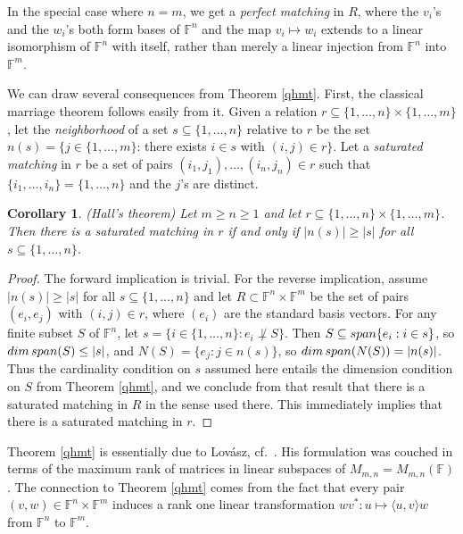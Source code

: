 \documentclass[10pt,a4paper]{amsart}
\newtheorem{cor}[thm]{Corollary}
\begin{document}
In the special case where $n = m$, we get a {\it perfect matching} in $R$, where the $v_i$'s and the $w_i$'s both form bases of $\mathbb{F}^n$ and the map $v_i \mapsto w_i$ extends to a linear isomorphism of $\mathbb{F}^n$ with itself, rather than merely a linear injection from $\mathbb{F}^n$ into $\mathbb{F}^m$.

We can draw several consequences from Theorem \ref{qhmt}. First, the classical marriage theorem follows easily from it. Given a relation $r \subseteq \{1, \ldots, n\} \times \{1, \ldots, m\}$, let the {\it neighborhood} of a set $s \subseteq \{1, \ldots, n\}$ relative to $r$ be the set $n(s) = \{j \in \{1, \ldots, m\}$: there exists $i \in s$ with $(i,j) \in r\}$. Let a {\it saturated matching} in $r$ be a set of pairs $(i_1, j_1), \ldots, (i_n, j_n) \in r$ such that $\{i_1, \ldots, i_n\} = \{1, \ldots, n\}$ and the $j$'s are distinct.

\begin{cor} \label{qhmtc} (Hall's theorem)
Let $m \geq n \geq 1$ and let $r \subseteq \{1, \ldots, n\}\times \{1, \ldots, m\}$. Then there is a saturated matching in $r$ if and only if $|n(s)| \geq |s|$ for all $s \subseteq \{1, \ldots, n\}$.
\end{cor}

\begin{proof}
The forward implication is trivial. For the reverse implication, assume $|n(s)| \geq |s|$ for all $s \subseteq \{1, \ldots, n\}$ and let $R \subset \mathbb{F}^n \times \mathbb{F}^m$ be the set of pairs $(e_i, e_j)$ with $(i,j) \in r$, where $(e_i)$ are the standard basis vectors. For any finite subset $S$ of $\mathbb{F}^n$, let $s = \{i \in \{1, \ldots, n\}: e_i \not\perp S\}$. Then $S \subseteq {\rm span}\{e_i: i \in s\}$, so ${\rm dim}\, {\rm span}(S) \leq |s|$, and $N(S) = \{e_j: j \in n(s)\}$, so ${\rm dim}\, {\rm span}(N(S)) = |n(s)|$. Thus the cardinality condition on $s$ assumed here entails the dimension condition on $S$ from Theorem \ref{qhmt}, and we conclude from that result that there is a saturated matching in $R$ in the sense used there. This immediately implies that there is a saturated matching in $r$.
\end{proof}

Theorem \ref{qhmt} is essentially due to Lovász, cf.\ \cite[Theorem 1*]{lovasz}. His formulation was couched in terms of the maximum rank of matrices in linear subspaces of $M_{m,n} = M_{m,n}(\mathbb{F})$. The connection to Theorem \ref{qhmt} comes from the fact that every pair $(v,w) \in \mathbb{F}^n\times\mathbb{F}^m$ induces a rank one linear transformation $wv^*: u \mapsto \langle u,v\rangle w$ from $\mathbb{F}^n$ to $\mathbb{F}^m$.
\end{document}
